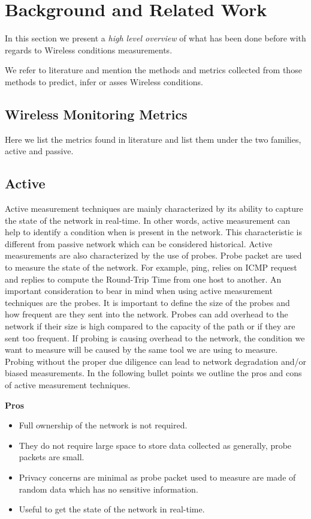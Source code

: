 \section{Background and Related Work}\label{Back_Related_Work}

In this section we present a \emph{high level overview} of what has been done before with regards to Wireless conditions measurements.

We refer to literature and mention the methods and metrics collected from those methods to predict, infer or asses Wireless conditions.

\subsection{Wireless Monitoring Metrics}

Here we list the metrics found in literature and list them under the two families, active and passive.

\subsection*{Active}

Active measurement techniques are mainly characterized by its ability to capture the state of the network in real-time. In other words, active measurement can help to identify a condition when is present in the network. This characteristic is different from passive network which can be considered historical. Active measurements are also characterized by the use of probes. Probe packet are used to measure the state of the network. For example, ping, relies on ICMP request and replies to compute the Round-Trip Time from one host to another. An important consideration to bear  in mind when using active measurement techniques are the probes. It is important to define the size of the probes and how frequent are they sent into the network. Probes can add overhead to the network if their size is high compared to the capacity of the path or if they are sent too frequent. If probing is causing overhead to the network, the condition we want to measure will be caused by the same tool we are using to measure. Probing without the proper due diligence can lead to network degradation and/or biased measurements. In the following bullet points we outline the pros and cons of active measurement techniques.

\textbf{Pros}
\begin{itemize}
	\item Full ownership of the network is not required.
	\item They do not require large space to store data collected as generally, probe packets are small.
	\item Privacy concerns are minimal as probe packet used to measure are made of random data which has no sensitive information.
	\item Useful to get the state of the network in real-time.
\end{itemize}
	

